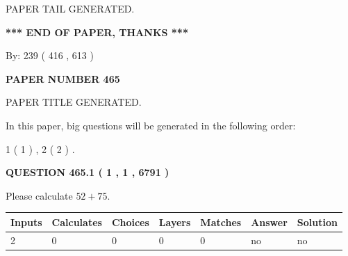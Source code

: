 \documentclass[12pt]{article}
\begin{document}
   
   
\vspace{2.0in} PAPER TAIL GENERATED.
   
   
   
   
\vspace{1.0in} 
{\textbf{\large{ *** END OF PAPER, THANKS *** }}} 
   
   
\hspace{1.0in} By: 
 239 ( 416 ,  613 )
   
   
   
   
\newpage 
\setcounter{page}{ 
   465001 } 
   
   
   
   
 {\textbf{ \Large{ PAPER NUMBER  465  }}}
   
   
\vspace{0.2in}
   
   
   
   
   
   
   
   
 \vspace{0.2in}
 
 
 
 
   
   
 PAPER TITLE GENERATED.
   
   
   
\vspace{0.2in}
   
In this paper, big questions will be generated in the following order: 
   
   
   1 ( 1 )
 ,
   2 ( 2 )
 .
  
\vspace{0.2in}
  
{\textbf{\Large{QUESTION
465.1 
 ( 1 , 1 , 6791 )
}}}
  
  
 
Please calculate $ %
52 +  %
75 $.
 
 
   
   
   
   
\noindent\begin{tabular}{|l|l|l|l|l|l|l|}
 \hline
Inputs & Calculates & Choices & Layers & Matches & Answer & Solution \\ \hline
 2  & 
 0  & 
 0
  & 
 0  & 
 0  & 
  no & 
  no 
  \\ \hline
 \end{tabular}
   
\end{document}
